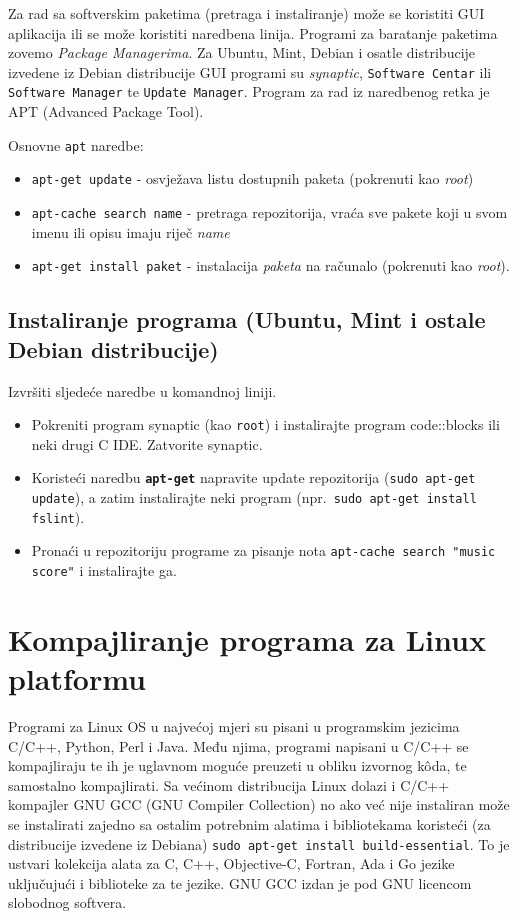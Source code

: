Za rad sa softverskim paketima (pretraga i instaliranje) može se koristiti GUI aplikacija ili se može koristiti naredbena linija. Programi za baratanje paketima zovemo \textit{Package Managerima}. Za Ubuntu, Mint, Debian i osatle distribucije izvedene iz Debian distribucije GUI programi su \textit{synaptic}, \texttt{Software Centar} ili \texttt{Software Manager} te \texttt{Update Manager}. Program za rad iz naredbenog retka je APT (Advanced Package Tool).

Osnovne \texttt{apt} naredbe:
\begin{itemize}
 \item \lstinline!apt-get update! - osvježava listu dostupnih paketa (pokrenuti kao \textit{root})
 \item \lstinline!apt-cache search name! - pretraga repozitorija, vraća sve pakete koji u svom imenu ili opisu imaju riječ \textit{name}
 \item \lstinline!apt-get install paket! - instalacija \textit{paketa} na računalo (pokrenuti kao \textit{root}).
\end{itemize}


\subsection*{Instaliranje programa (Ubuntu, Mint i ostale Debian distribucije)}
\begin{zadatak}
Izvršiti sljedeće naredbe u komandnoj liniji.
\begin{itemize}
 \item Pokreniti program synaptic (kao \texttt{root}) i instalirajte program code::blocks ili neki drugi C IDE. Zatvorite synaptic.
\item Koristeći naredbu \textbf{\texttt{apt-get}} napravite update repozitorija (\texttt{sudo apt-get update}), a zatim instalirajte neki program (npr.~\texttt{sudo apt-get install fslint}).
\item Pronaći u repozitoriju programe za pisanje nota \texttt{apt-cache search "music score"} i instalirajte ga.
\end{itemize}
\end{zadatak}

\section{Kompajliranje programa za Linux platformu}
Programi za Linux OS u najvećoj mjeri su pisani u programskim jezicima C/C++, Python, Perl i Java. Među njima, programi napisani u C/C++ se kompajliraju te ih je uglavnom moguće preuzeti u obliku izvornog k\^oda, te samostalno kompajlirati. Sa većinom distribucija Linux dolazi i C/C++ kompajler GNU GCC (GNU Compiler Collection) no ako već nije instaliran može se instalirati zajedno sa ostalim potrebnim alatima i bibliotekama koristeći (za distribucije izvedene iz Debiana) \texttt{sudo apt-get install build-essential}. To je ustvari kolekcija alata za C, C++, Objective-C, Fortran, Ada i Go jezike uključujući i biblioteke za te jezike. GNU GCC izdan je pod GNU licencom slobodnog softvera.

